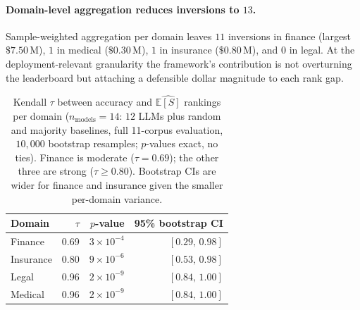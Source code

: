\documentclass[11pt]{article}
\newcommand{\ES}{\mathbb{E}[S]}
\begin{document}
\paragraph{Domain-level aggregation reduces inversions to $13$.}
Sample-weighted aggregation per domain leaves $11$ inversions in
finance (largest $\$7.50$\,M), $1$ in medical
($\$0.30$\,M), $1$ in insurance ($\$0.80$\,M), and $0$ in legal.
At the deployment-relevant granularity the framework's
contribution is not overturning the leaderboard but attaching a
defensible dollar magnitude to each rank gap.

\begin{table}[t]\centering
\begin{tabular}{lrrr}
\toprule
Domain & $\tau$ & $p$-value & 95\% bootstrap CI \\
\midrule
  Finance   & 0.69 & $3{\times}10^{-4}$ & $[0.29,\,0.98]$ \\
  Insurance & 0.80 & $9{\times}10^{-6}$ & $[0.53,\,0.98]$ \\
  Legal     & 0.96 & $2{\times}10^{-9}$ & $[0.84,\,1.00]$ \\
  Medical   & 0.96 & $2{\times}10^{-9}$ & $[0.84,\,1.00]$ \\
\bottomrule
\end{tabular}
\caption{Kendall $\tau$ between accuracy and $\widehat{\ES}$
rankings per domain ($n_{\text{models}}{=}14$: $12$ LLMs plus
random and majority baselines, full 11-corpus evaluation,
$10{,}000$ bootstrap resamples; $p$-values exact, no ties).
Finance is moderate ($\tau{=}0.69$); the other three are strong
($\tau \geq 0.80$). Bootstrap CIs are wider for finance and
insurance given the smaller per-domain variance.}
\label{tab:h1}
\vspace{-1em}
\end{table}
\end{document}

